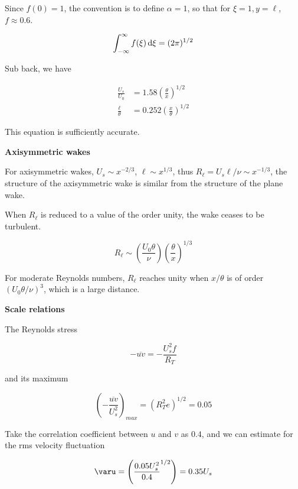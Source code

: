 \documentclass{article}
\begin{document}
Since $f(0)=1$, the convention is to define $\alpha=1$, so that for $\xi=1, y=\ell$, $f\approx 0.6$.

\begin{equation*}
    \int_{-\infty}^{\infty}f(\xi)\mathop{}\!\mathrm{d}\xi=(2\pi)^{1/2}
\end{equation*}

Sub back, we have

\begin{align*}
    \frac{U_s}{U_0}&=1.58\left(\frac{\theta}{x}\right)^{1/2}\\
    \frac{\ell}{\theta}&=0.252\left(\frac{x}{\theta}\right)^{1/2}
\end{align*}

This equation is sufficiently accurate.

\textbf{Axisymmetric wakes}

For axisymmetric wakes, $U_s\sim x^{-2/3}$, $\ell\sim x^{1/3}$, thus $R_\ell=U_s\ell/\nu \sim x^{-1/3}$, the structure of the axisymmetric wake is similar from the structure of the plane wake.

When $R_\ell$ is reduced to a value of the order unity, the wake ceases to be turbulent.

\begin{equation*}
    R_\ell\sim\left(\frac{U_0\theta}{\nu}\right)\left(\frac{\theta}{x}\right)^{1/3}
\end{equation*}

For moderate Reynolds numbers, $R_\ell$ reaches unity when $x/\theta$ is of order $(U_0\theta/\nu)^3$, which is a large distance.

\textbf{Scale relations}

The Reynolds stress

\begin{equation*}
    -\overline{uv}=-\frac{U_s^2 f}{R_T}
\end{equation*}

and its maximum

\begin{equation*}
    \left(-\frac{\overline{uv}}{U_s^2}\right)_{max}=(R_T^2 e)^{1/2}=0.05
\end{equation*}

Take the correlation coefficient between $u$ and $v$ as $0.4$, and we can estimate for the rms velocity fluctuation

\begin{equation*}
    \varu=\left(\frac{0.05U_s^2}{0.4}^{1/2}\right)=0.35U_s
\end{equation*}
\end{document}
